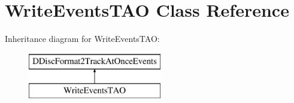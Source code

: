 \hypertarget{class_write_events_t_a_o}{}\section{Write\+Events\+T\+AO Class Reference}
\label{class_write_events_t_a_o}
Inheritance diagram for Write\+Events\+T\+AO\+:\begin{figure}[H]
\begin{center}
\leavevmode
\includegraphics[height=2.000000cm]{class_write_events_t_a_o}
\end{center}
\end{figure}
